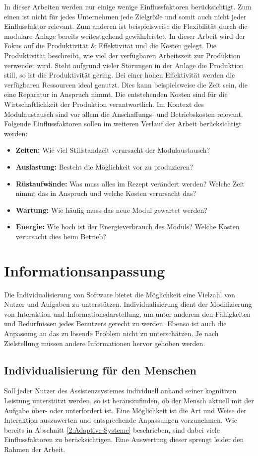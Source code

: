 In dieser Arbeiten werden nur einige wenige Einflussfaktoren berücksichtigt. Zum einen ist nicht für jedes Unternehmen jede Zielgröße und somit auch nicht jeder Einflussfaktor relevant. Zum anderen ist beispielsweise die Flexibilität durch die modulare Anlage bereits weitestgehend gewährleistet. In dieser Arbeit wird der Fokus auf die Produktivität \& Effektivität und die Kosten gelegt. Die Produktivität beschreibt, wie viel der verfügbaren Arbeitszeit zur Produktion verwendet wird. Steht aufgrund vieler Störungen in der Anlage die Produktion still, so ist die Produktivität gering. Bei einer hohen Effektivität werden die verfügbaren Ressourcen ideal genutzt. Dies kann beispielsweise die Zeit sein, die eine Reparatur in Anspruch nimmt. Die entstehenden Kosten sind für die Wirtschaftlichkeit der Produktion verantwortlich. \cite{Gottmann2016} Im Kontext des Modulaustausch sind vor allem die Anschaffungs- und Betriebskosten relevant. Folgende Einflussfaktoren sollen im weiteren Verlauf der Arbeit berücksichtigt werden:
\begin{itemize}
\item \textbf{Zeiten:} Wie viel Stillstandzeit verursacht der Modulaustausch?
\item \textbf{Auslastung:} Besteht die Möglichkeit vor zu produzieren?
\item \textbf{Rüstaufwände:} Was muss alles im Rezept verändert werden? Welche Zeit nimmt das in Anspruch und welche Kosten verursacht das?
\item \textbf{Wartung:} Wie häufig muss das neue Modul gewartet werden?
\item \textbf{Energie:} Wie hoch ist der Energieverbrauch des Moduls? Welche Kosten verursacht dies beim Betrieb?
\end{itemize}

\section{Informationsanpassung}
Die Individualisierung von Software bietet die Möglichkeit eine Vielzahl von Nutzer und Aufgaben zu unterstützen. Individualisierung dient der Modifizierung von Interaktion und Informationsdarstellung, um unter anderem den Fähigkeiten und Bedürfnissen jedes Benutzers gerecht zu werden. Ebenso ist auch die Anpassung an das zu lösende Problem nicht zu unterschätzen. Je nach Zielstellung müssen andere Informationen hervor gehoben werden.

\subsection{Individualisierung für den Menschen}
Soll jeder Nutzer des Assistenzsystemes individuell anhand seiner kognitiven Leistung unterstützt werden, so ist herauszufinden, ob der Mensch aktuell mit der Aufgabe über- oder unterfordert ist. Eine Möglichkeit ist die Art und Weise der Interaktion auszuwerten und entsprechende Anpassungen vorzunehmen. Wie bereits in Abschnitt \ref{2:Adaptive-Systeme} beschrieben, sind dabei viele Einflussfaktoren zu berücksichtigen. Eine Auswertung dieser sprengt leider den Rahmen der Arbeit.

